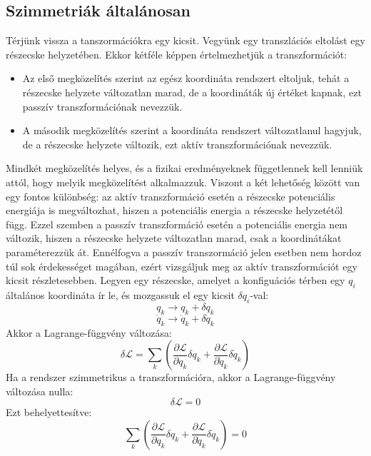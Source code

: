 \documentclass[a4paper,12pt]{article}
\begin{document}
\subsection{Szimmetriák általánosan}
Térjünk vissza a tanszormációkra egy kicsit. Vegyünk egy transzlációs eltolást egy részecske helyzetében. Ekkor kétféle képpen értelmezhetjük a transzformációt:
\begin{itemize}
    \item Az első megközelítés szerint az egész koordináta rendszert eltoljuk, tehát a részecske helyzete változatlan marad, de a koordináták új értéket kapnak, ezt passzív transzformációnak nevezzük.
    \item A második megközelítés szerint a koordináta rendszert változatlanul hagyjuk, de a részecske helyzete változik, ezt aktív transzformációnak nevezzük.
\end{itemize}
Mindkét megközelítés helyes, és a fizikai eredményeknek függetlennek kell lenniük attól, hogy melyik megközelítést alkalmazzuk. Viszont a két lehetőség között van egy fontos különbség: az aktív transzformáció
esetén a részecske potenciális energiája is megváltozhat, hiszen a potenciális energia a részecske helyzetétől függ. Ezzel szemben a passzív transzformáció esetén a potenciális energia nem változik, hiszen a részecske helyzete változatlan marad,
csak a koordinátákat paraméterezzük át. Ennélfogva a passzív transzormáció jelen esetben nem hordoz túl sok érdekességet magában, ezért vizsgáljuk meg az aktív transzformációt egy kicsit részletesebben.
Legyen egy részecske, amelyet a konfiguációs térben egy $q_i$ általános koordináta ír le, és mozgassuk el egy kicsit $\delta q_i$-val:
\begin{equation}
    q_k \to q_k + \delta q_k
\end{equation}
\begin{equation}
    \dot{q}_k \to \dot{q}_k + \delta \dot{q}_k
\end{equation}
Akkor a Lagrange-függvény változása:
\begin{equation}
    \delta \mathcal{L} = \sum_k \left( \frac{\partial \mathcal{L}}{\partial q_k} \delta q_k + \frac{\partial \mathcal{L}}{\partial \dot{q}_k} \delta \dot{q}_k \right)
\end{equation}
Ha a rendszer szimmetrikus a transzformációra, akkor a Lagrange-függvény változása nulla:
\begin{equation}
    \delta \mathcal{L} = 0
\end{equation}
Ezt behelyettesítve:
\begin{equation}
    \sum_k \left( \frac{\partial \mathcal{L}}{\partial q_k} \delta q_k + \frac{\partial \mathcal{L}}{\partial \dot{q}_k} \delta \dot{q}_k \right) = 0
\end{equation}
\end{document}
